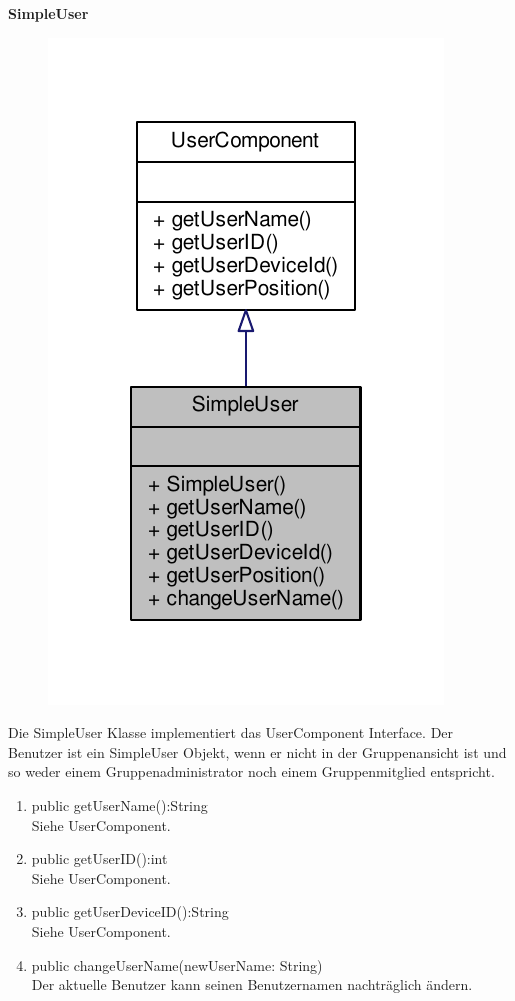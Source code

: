 \textbf{SimpleUser}
\begin{figure}[H]
	\includegraphics[scale = 1]{res/umlClasses/simple_user__coll__graph.pdf}
	\centering
\end{figure}
Die SimpleUser Klasse implementiert das UserComponent Interface. Der Benutzer ist ein SimpleUser Objekt, wenn er nicht in der Gruppenansicht ist und so weder einem Gruppenadministrator noch einem Gruppenmitglied entspricht.
\begin{enumerate}
	\item public getUserName():String\\
		Siehe UserComponent.
	\item public getUserID():int\\
		Siehe UserComponent.
	\item public getUserDeviceID():String\\
		Siehe UserComponent.
	\item public changeUserName(newUserName: String)\\
	Der aktuelle Benutzer kann seinen Benutzernamen nachträglich ändern.
\end{enumerate}

